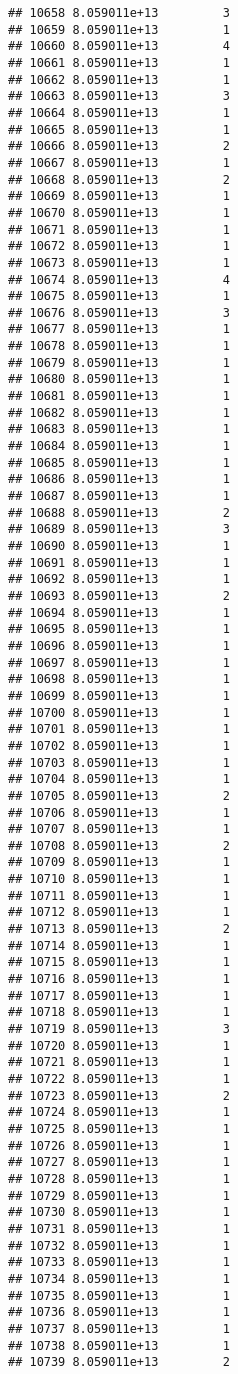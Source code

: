 \documentclass[
]{article}
\begin{document}
\begin{verbatim}
## 10658 8.059011e+13         3
## 10659 8.059011e+13         1
## 10660 8.059011e+13         4
## 10661 8.059011e+13         1
## 10662 8.059011e+13         1
## 10663 8.059011e+13         3
## 10664 8.059011e+13         1
## 10665 8.059011e+13         1
## 10666 8.059011e+13         2
## 10667 8.059011e+13         1
## 10668 8.059011e+13         2
## 10669 8.059011e+13         1
## 10670 8.059011e+13         1
## 10671 8.059011e+13         1
## 10672 8.059011e+13         1
## 10673 8.059011e+13         1
## 10674 8.059011e+13         4
## 10675 8.059011e+13         1
## 10676 8.059011e+13         3
## 10677 8.059011e+13         1
## 10678 8.059011e+13         1
## 10679 8.059011e+13         1
## 10680 8.059011e+13         1
## 10681 8.059011e+13         1
## 10682 8.059011e+13         1
## 10683 8.059011e+13         1
## 10684 8.059011e+13         1
## 10685 8.059011e+13         1
## 10686 8.059011e+13         1
## 10687 8.059011e+13         1
## 10688 8.059011e+13         2
## 10689 8.059011e+13         3
## 10690 8.059011e+13         1
## 10691 8.059011e+13         1
## 10692 8.059011e+13         1
## 10693 8.059011e+13         2
## 10694 8.059011e+13         1
## 10695 8.059011e+13         1
## 10696 8.059011e+13         1
## 10697 8.059011e+13         1
## 10698 8.059011e+13         1
## 10699 8.059011e+13         1
## 10700 8.059011e+13         1
## 10701 8.059011e+13         1
## 10702 8.059011e+13         1
## 10703 8.059011e+13         1
## 10704 8.059011e+13         1
## 10705 8.059011e+13         2
## 10706 8.059011e+13         1
## 10707 8.059011e+13         1
## 10708 8.059011e+13         2
## 10709 8.059011e+13         1
## 10710 8.059011e+13         1
## 10711 8.059011e+13         1
## 10712 8.059011e+13         1
## 10713 8.059011e+13         2
## 10714 8.059011e+13         1
## 10715 8.059011e+13         1
## 10716 8.059011e+13         1
## 10717 8.059011e+13         1
## 10718 8.059011e+13         1
## 10719 8.059011e+13         3
## 10720 8.059011e+13         1
## 10721 8.059011e+13         1
## 10722 8.059011e+13         1
## 10723 8.059011e+13         2
## 10724 8.059011e+13         1
## 10725 8.059011e+13         1
## 10726 8.059011e+13         1
## 10727 8.059011e+13         1
## 10728 8.059011e+13         1
## 10729 8.059011e+13         1
## 10730 8.059011e+13         1
## 10731 8.059011e+13         1
## 10732 8.059011e+13         1
## 10733 8.059011e+13         1
## 10734 8.059011e+13         1
## 10735 8.059011e+13         1
## 10736 8.059011e+13         1
## 10737 8.059011e+13         1
## 10738 8.059011e+13         1
## 10739 8.059011e+13         2

\end{verbatim}
\end{document}
